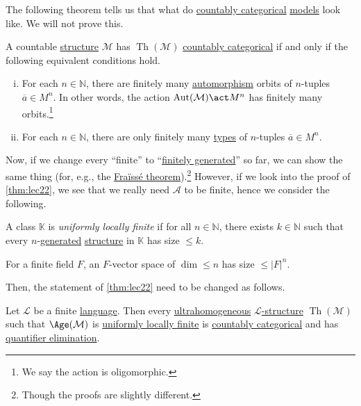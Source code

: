 The following theorem tells us that what do \hyperref[def:countably-categorical]{countably categorical} \hyperref[def:model]{models} look like. We will not prove this.

\begin{theorem}\label{thm:Ryll-Nardzewski}
	A countable \hyperref[def:structure]{structure} \(\mathcal{M} \) has \(\mathop{\mathrm{Th}}(\mathcal{M} )\) \hyperref[def:countably-categorical]{countably categorical} if and only if the following equivalent conditions hold.
	\begin{enumerate}[(i)]
		\item For each \(n\in \mathbb{N} \), there are finitely many \hyperref[def:automorphism]{automorphism} orbits of \(n\)-tuples \(\overline{a} \in M^n\). In other words, the action \(\mathop{\mathrm{Aut}}(\mathcal{M} )\act M^n\) has finitely many orbits.\footnote{We say the action is oligomorphic.}
		\item For each \(n\in \mathbb{N} \), there are only finitely many \hyperref[def:type]{types} of \(n\)-tuples \(\overline{a} \in M^n\).
	\end{enumerate}
\end{theorem}

Now, if we change every ``finite'' to ``\hyperref[def:finitely-generated]{finitely generated}'' so far, we can show the same thing (for, e.g., the \hyperref[thm:Fraisse]{Fraïssé theorem}).\footnote{Though the proofs are slightly different.} However, if we look into the proof of \autoref{thm:lec22}, we see that we really need \(\mathcal{A} \) to be finite, hence we consider the following.

\begin{definition}\label{def:uniformly-locally-finite}
	A class \(\mathbb{K} \) is \emph{uniformly locally finite} if for all \(n\in \mathbb{N} \), there exists \(k\in \mathbb{N} \) such that every \(n\)-\hyperref[def:finitely-generated]{generated} \hyperref[def:structure]{structure} in \(\mathbb{K} \) has size \(\leq k\).
\end{definition}

\begin{eg}
	For a finite field \(F\), an \(F\)-vector space of \(\dim \leq n\) has size \(\leq \vert F \vert ^n\).
\end{eg}

Then, the statement of \autoref{thm:lec22} need to be changed as follows.
\begin{theorem}\label{thm:lec22-new}
	Let \(\mathcal{L} \) be a finite \hyperref[def:language]{language}. Then every \hyperref[def:ultrahomogeneous]{ultrahomogeneous} \hyperref[def:structure]{\(\mathcal{L} \)-structure} \(\mathop{\mathrm{Th}}(\mathcal{M})\) such that \(\Age(\mathcal{M} )\) is \hyperref[def:uniformly-locally-finite]{uniformly locally finite} is \hyperref[def:countably-categorical]{countably categorical} and has \hyperref[def:quantifier-elimination]{quantifier elimination}.
\end{theorem}


